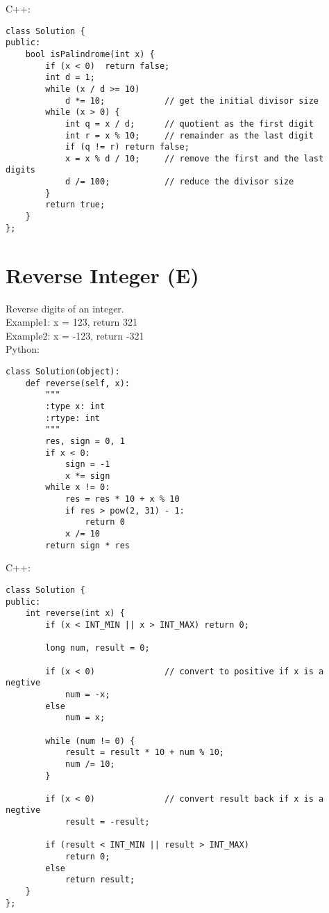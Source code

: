 C++:
\lstset{language=c++}
\begin{lstlisting}
class Solution {
public:
    bool isPalindrome(int x) {
        if (x < 0)  return false;
        int d = 1;      
        while (x / d >= 10) 
            d *= 10;            // get the initial divisor size
        while (x > 0) {
            int q = x / d;      // quotient as the first digit
            int r = x % 10;     // remainder as the last digit
            if (q != r) return false;
            x = x % d / 10;     // remove the first and the last digits
            d /= 100;           // reduce the divisor size
        }
        return true;
    }
};
\end{lstlisting}


\section{Reverse Integer (E)}
Reverse digits of an integer. \\

Example1: x = 123, return 321\\
Example2: x = -123, return -321\\ 

Python:
\lstset{language=python}
\begin{lstlisting}
class Solution(object):
    def reverse(self, x):
        """
        :type x: int
        :rtype: int
        """    
        res, sign = 0, 1
        if x < 0:
            sign = -1
            x *= sign
        while x != 0:
            res = res * 10 + x % 10
            if res > pow(2, 31) - 1:
                return 0
            x /= 10
        return sign * res
\end{lstlisting}

C++:
\lstset{language=c++}
\begin{lstlisting}
class Solution {
public:
    int reverse(int x) {
        if (x < INT_MIN || x > INT_MAX) return 0;
       
        long num, result = 0;
      
        if (x < 0)              // convert to positive if x is a negtive
            num = -x;
        else
            num = x;
      
        while (num != 0) {
            result = result * 10 + num % 10;
            num /= 10;
        }
        
        if (x < 0)              // convert result back if x is a negtive
            result = -result;

        if (result < INT_MIN || result > INT_MAX)
            return 0;
        else
            return result;
    }
};
\end{lstlisting}


